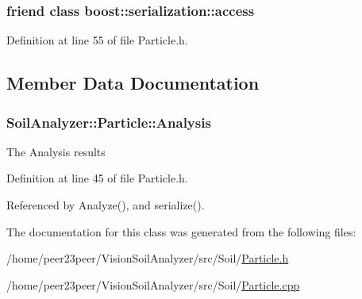 \subsubsection[{boost\+::serialization\+::access}]{\setlength{\rightskip}{0pt plus 5cm}friend class boost\+::serialization\+::access\hspace{0.3cm}{\ttfamily [friend]}}\label{class_soil_analyzer_1_1_particle_ac98d07dd8f7b70e16ccb9a01abf56b9c}


Definition at line 55 of file Particle.\+h.



\subsection{Member Data Documentation}
\hypertarget{class_soil_analyzer_1_1_particle_a4df8d4d8fb130bce05fef5d4601ef89e}{}
\subsubsection[{Analysis}]{ Soil\+Analyzer\+::\+Particle\+::\+Analysis}\label{class_soil_analyzer_1_1_particle_a4df8d4d8fb130bce05fef5d4601ef89e}
The Analysis results 

Definition at line 45 of file Particle.\+h.



Referenced by Analyze(), and serialize().



The documentation for this class was generated from the following files\+:\begin{DoxyCompactItemize}
\item 
/home/peer23peer/\+Vision\+Soil\+Analyzer/src/\+Soil/\hyperlink{_particle_8h}{Particle.\+h}\item 
/home/peer23peer/\+Vision\+Soil\+Analyzer/src/\+Soil/\hyperlink{_particle_8cpp}{Particle.\+cpp}\end{DoxyCompactItemize}
